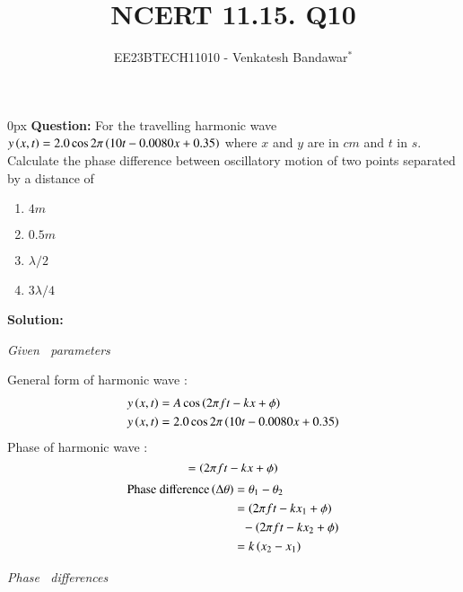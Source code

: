 \documentclass[journal,12pt,twocolumn]{IEEEtran}
\theoremstyle{remark}
\begin{document}

\vspace{3cm}

\title{NCERT 11.15. Q10}
\author{EE23BTECH11010 - Venkatesh Bandawar$^{*}$%
}
\maketitle
\newpage
\bigskip

\renewcommand{\thefigure}{\theenumi}
\renewcommand{\thetable}{\arabic{table}}



\parindent 0px
\textbf{Question:} For the travelling harmonic wave
$y\left(x, t\right) = 2.0 \cos 2\pi \left(10t - 0.0080 x + 0.35\right)$ where $x$ and $y$ are in $cm$ and $t$ in $s$. Calculate the phase difference between oscillatory
motion of two points separated by a distance of 

\begin{enumerate} [label=(\alph*)]
    \item $4 m$
    \item $0.5 m$
    \item $\lambda/2$
    \item $3\lambda/4$
\end{enumerate}

\textbf{Solution:}  
\begin{table}[htbp] \small
\centering

\vspace{0.2cm}
\caption{\normalsize\textsl{Given \, parameters}}
\label{given parameters list}
\end{table}

 General form of harmonic wave :
\begin{align}
    y\left(x, t\right) &= A \cos \left(2\pi f t - k x + \phi\right) \\
    y\left(x, t\right) &= 2.0 \cos 2\pi \left(10t - 0.0080 x + 0.35\right)
\end{align}
Phase of harmonic wave :
\begin{equation}
    = \left(2\pi f t - k x + \phi\right)
\end{equation}
\begin{align}
    \text{Phase difference} \left(\Delta \theta\right)&= \theta_1 - \theta_2 \\
    &= \left( 2\pi f t - kx_1 + \phi\right) \nonumber \\
    & \,\,\,\,- \left(2\pi f t -kx_2 + \phi\right)\\
    &= k\left(x_2 - x_1\right) \label{equation for phase difference}
\end{align}

\vspace{3cm}

\begin{table}[htbp] \small
\centering

\caption{\normalsize\textsl{Phase \, differences}}
\label{Solution}
\end{table}
\end{document}
